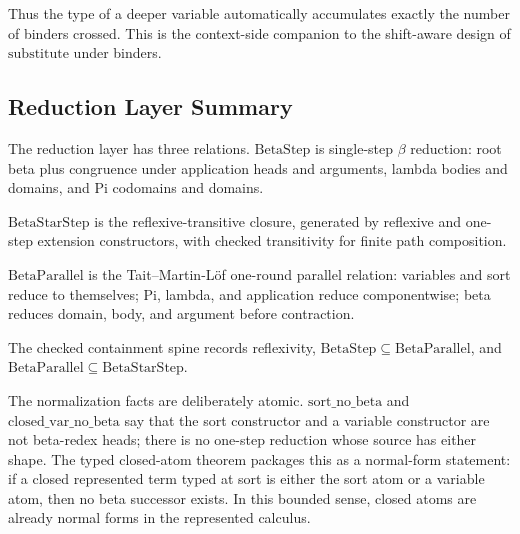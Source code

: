 Thus the type of a deeper variable automatically accumulates exactly the
number of binders crossed. This is the context-side companion to the
shift-aware design of $\mathrm{substitute}$ under binders.

\subsection{Reduction Layer Summary}\label{subsec:reconstruction-reduction-summary}

The reduction layer has three relations. $\mathrm{BetaStep}$ is single-step
$\beta$ reduction: root beta plus congruence under application heads and
arguments, lambda bodies and domains, and Pi codomains and domains.

$\mathrm{BetaStarStep}$ is the reflexive-transitive closure, generated by
reflexive and one-step extension constructors, with checked transitivity for
finite path composition.

$\mathrm{BetaParallel}$ is the Tait--Martin-L\"of one-round parallel relation:
variables and sort reduce to themselves; Pi, lambda, and application reduce
componentwise; beta reduces domain, body, and argument before contraction.

The checked containment spine records reflexivity, $\mathrm{BetaStep}
\subseteq \mathrm{BetaParallel}$, and $\mathrm{BetaParallel} \subseteq
\mathrm{BetaStarStep}$.



The normalization facts are deliberately atomic. $\mathrm{sort\_no\_beta}$
and $\mathrm{closed\_var\_no\_beta}$ say that the sort constructor and a
variable constructor are not beta-redex heads; there is no one-step reduction
whose source has either shape. The typed closed-atom theorem packages this as
a normal-form statement: if a closed represented term typed at sort is either
the sort atom or a variable atom, then no beta successor exists. In this
bounded sense, closed atoms are already normal forms in the represented
calculus.

